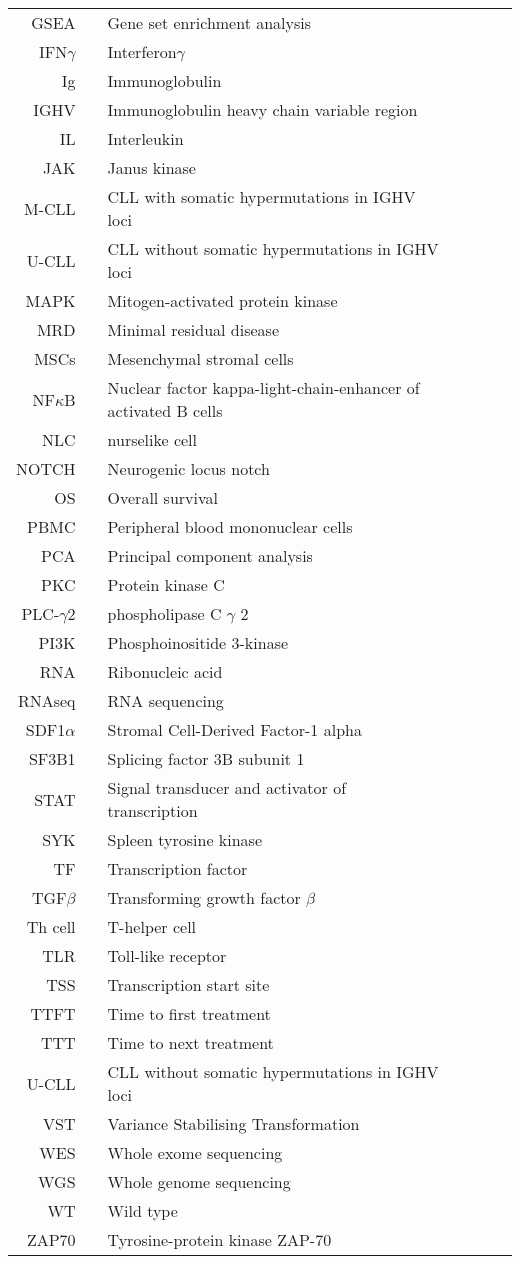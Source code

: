 \documentclass[11pt, a4paper, twosided]{book}
\begin{document}
\begin{tabular}{rp{0.2cm}lp{1cm}rp{0.2cm}l}
    GSEA & & Gene set enrichment analysis  \\
    IFN$\gamma$ & & Interferon$\gamma$   \\ 
    Ig & & Immunoglobulin \\
    IGHV & & Immunoglobulin heavy chain variable region \\
    IL & & Interleukin \\
    JAK & & Janus kinase \\
    M-CLL & & CLL with somatic hypermutations in IGHV loci \\
    U-CLL & & CLL without somatic hypermutations in IGHV loci \\
    MAPK & & Mitogen-activated protein kinase  \\
    MRD & & Minimal residual disease  \\
    MSCs & & Mesenchymal stromal cells  \\
    NF$\kappa$B & & Nuclear factor kappa-light-chain-enhancer of activated B cells \\
    NLC & & nurselike cell  \\
    NOTCH & & Neurogenic locus notch  \\
    OS & & Overall survival \\
    PBMC & & Peripheral blood mononuclear cells \\
    PCA & & Principal component analysis \\
    PKC & & Protein kinase C \\
    PLC-$\gamma$2 & & phospholipase C $\gamma$ 2 \\
    PI3K & & Phosphoinositide 3-kinase \\
    RNA & & Ribonucleic acid  \\
    RNAseq & & RNA sequencing \\
    SDF1$\alpha$ & & Stromal Cell-Derived Factor-1 alpha  \\
    SF3B1 & & Splicing factor 3B subunit 1 \\
    STAT & & Signal transducer and activator of transcription \\
    SYK & & Spleen tyrosine kinase \\
    TF & & Transcription factor \\
    TGF$\beta$ & & Transforming growth factor $\beta$ \\
    Th cell & & T-helper cell \\
    TLR & & Toll-like receptor \\ 
    TSS & & Transcription start site \\
    TTFT & & Time to first treatment \\
    TTT & & Time to next treatment \\
    U-CLL & & CLL without somatic hypermutations in IGHV loci \\
    VST & & Variance Stabilising Transformation \\
    WES & & Whole exome sequencing \\
    WGS & & Whole genome sequencing \\
    WT & & Wild type \\
    ZAP70 & & Tyrosine-protein kinase ZAP-70 \\


\end{tabular}
\end{document}
